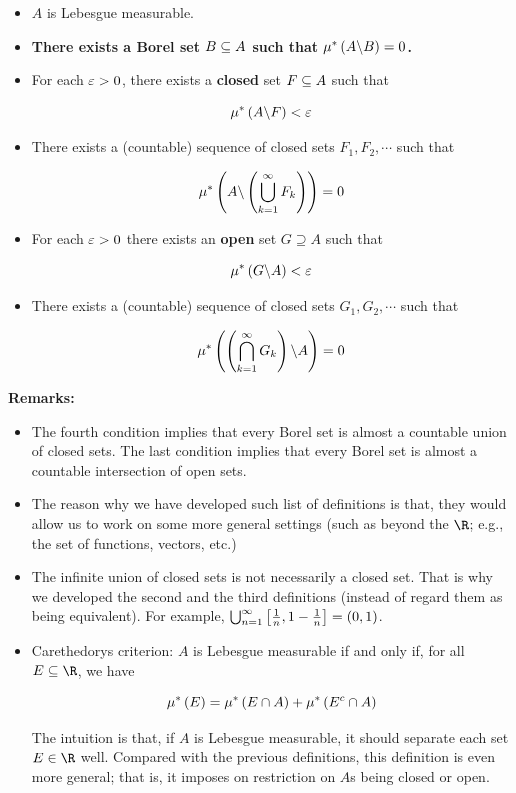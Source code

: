 \documentclass[
]{article}
\begin{document}
\begin{itemize}
\item
  \(A\) is Lebesgue measurable.
\item
  \textbf{There exists a Borel set \(B\se A\) such that
  \(\mu^*\pr{A\c B} = 0\).}
\item
  For each \(\ve>0\), there exists a \textbf{closed} set \(F\se A\) such
  that

  \[\mu^*\pr{A\c F}<\ve\]
\item
  There exists a (countable) sequence of closed sets \(F_1,F_2,\cdots\)
  such that

  \[\mu^*\pr{A\c \pr{\uinf F_k}} = 0\]
\item
  For each \(\ve>0\) there exists an \textbf{open} set \(G \supseteq A\)
  such that

  \[\mu^*\pr{G\c A}<\ve\]
\item
  There exists a (countable) sequence of closed sets \(G_1,G_2,\cdots\)
  such that

  \[\mu^*\pr{\pr{\iinf G_k}\c A} = 0\]
\end{itemize}

\textbf{Remarks:}

\begin{itemize}
\item
  The fourth condition implies that every Borel set is almost a
  countable union of closed sets. The last condition implies that every
  Borel set is almost a countable intersection of open sets.
\item
  The reason why we have developed such list of definitions is that,
  they would allow us to work on some more general settings (such as
  beyond the \(\R\); e.g., the set of functions, vectors, etc.)
\item
  The infinite union of closed sets is not necessarily a closed set.
  That is why we developed the second and the third definitions (instead
  of regard them as being equivalent). For example,
  \(\uinf[n]\br{\frac1n,1-\frac1n} = \pr{0,1}\).
\item
  Carethedory\textquotesingle s criterion: \(A\) is Lebesgue measurable
  if and only if, for all \(E\se \R\), we have

  \[\mu^*\pr{E} = \mu^*\pr{E\cap A}+\mu^*\pr{E^c\cap A}\]

  The intuition is that, if \(A\) is Lebesgue measurable, it should
  separate each set \(E\in \R\) well. Compared with the previous
  definitions, this definition is even more general; that is, it imposes
  on restriction on \(A\)\textquotesingle s being closed or open.
\end{itemize}
\end{document}
